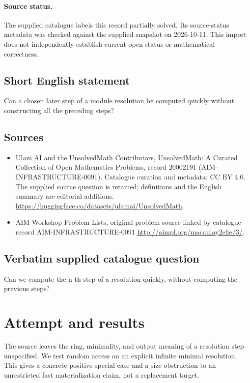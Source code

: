 \documentclass[11pt]{article}
\begin{document}
\paragraph{Source status.}
The supplied catalogue labels this record partially solved. Its source-status metadata was checked against the supplied snapshot on 2026-10-11. This import does not independently establish current open status or mathematical correctness.
\subsection{Short English statement}
Can a chosen later step of a module resolution be computed quickly without constructing all the preceding steps?
\subsection{Sources}
\begin{itemize}
\item[S1] Ulam AI and the UnsolvedMath Contributors, UnsolvedMath: A Curated Collection of Open Mathematics Problems, record 20002191 (AIM-INFRASTRUCTURE-0091). Catalogue curation and metadata: CC BY 4.0. The supplied source question is retained; definitions and the English summary are editorial additions.
\url{https://huggingface.co/datasets/ulamai/UnsolvedMath}.
\item[S2] AIM Workshop Problem Lists, original problem source linked by catalogue record AIM-INFRASTRUCTURE-0091
\url{http://aimpl.org/macaulay2efie/3/}.
\end{itemize}
\subsection{Verbatim supplied catalogue question}
Can we compute the n-th step of a resolution quickly, without computing the previous steps?

\section{Attempt and results}
The source leaves the ring, minimality, and output meaning of a resolution
step unspecified. We test random access on an explicit infinite minimal
resolution. This gives a concrete positive special case and a size obstruction
to an unrestricted fast materialization claim, not a replacement target.
\end{document}
